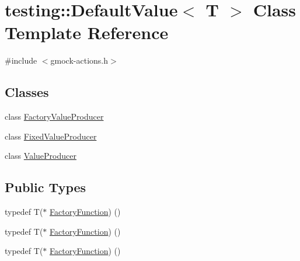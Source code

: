 \hypertarget{classtesting_1_1_default_value}{}\section{testing\+::Default\+Value$<$ T $>$ Class Template Reference}
\label{classtesting_1_1_default_value}


{\ttfamily \#include $<$gmock-\/actions.\+h$>$}

\subsection*{Classes}
\begin{DoxyCompactItemize}
\item 
class \mbox{\hyperlink{classtesting_1_1_default_value_1_1_factory_value_producer}{Factory\+Value\+Producer}}
\item 
class \mbox{\hyperlink{classtesting_1_1_default_value_1_1_fixed_value_producer}{Fixed\+Value\+Producer}}
\item 
class \mbox{\hyperlink{classtesting_1_1_default_value_1_1_value_producer}{Value\+Producer}}
\end{DoxyCompactItemize}
\subsection*{Public Types}
\begin{DoxyCompactItemize}
\item 
typedef T($\ast$ \mbox{\hyperlink{classtesting_1_1_default_value_a5763a68d75e0a4c97fcaff708e2df803}{Factory\+Function}}) ()
\item 
typedef T($\ast$ \mbox{\hyperlink{classtesting_1_1_default_value_a5763a68d75e0a4c97fcaff708e2df803}{Factory\+Function}}) ()
\item 
typedef T($\ast$ \mbox{\hyperlink{classtesting_1_1_default_value_a5763a68d75e0a4c97fcaff708e2df803}{Factory\+Function}}) ()
\end{DoxyCompactItemize}
